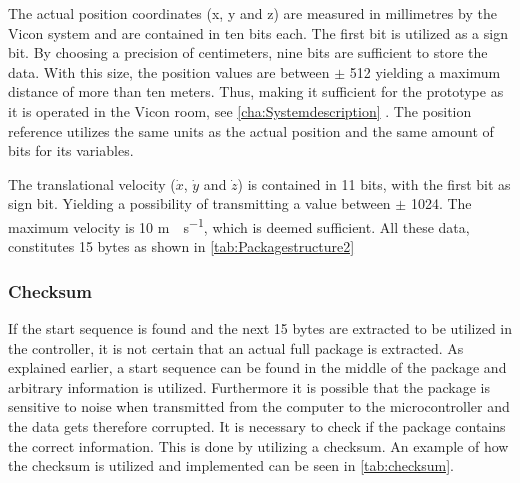 The actual position coordinates (x, y and z) are measured in millimetres by the Vicon system and are contained in ten bits each. The first bit is utilized as a sign bit. By choosing a precision of centimeters, nine bits are sufficient to store the data. With this size, the position values are between $\pm$ 512 yielding a maximum distance of more than ten meters. Thus, making it sufficient for the prototype as it is operated in the Vicon room, see \autoref{cha:Systemdescription} . The position reference utilizes the same units as the actual position and the same amount of bits for its variables.

The translational velocity ($\dot{x}$, $\dot{y}$ and $\dot{z}$) is contained in 11 bits, with the first bit as sign bit. Yielding a possibility of transmitting a value between $\pm$ 1024. The maximum velocity is 10 \si{m \cdot s^{-1}}, which is deemed sufficient. All these data, constitutes 15 bytes as shown in \autoref{tab:Packagestructure2}

\subsubsection{Checksum}
If the start sequence is found and the next 15 bytes are extracted to be utilized in the controller, it is not certain that an actual full package is extracted. As explained earlier, a start sequence can be found in the middle of the package and arbitrary information is utilized. Furthermore it is possible that the package is sensitive to noise when transmitted from the computer to the microcontroller and the data gets therefore corrupted. It is necessary to check if the package contains the correct information. This is done by utilizing a checksum. An example of how the checksum is utilized and implemented can be seen in \autoref{tab:checksum}.  

